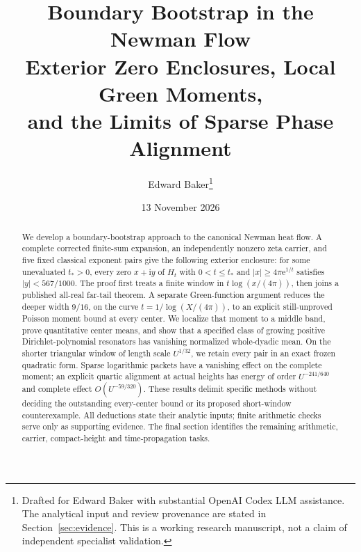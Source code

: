 \documentclass[11pt]{article}
\title{Boundary Bootstrap in the Newman Flow\\
\large Exterior Zero Enclosures, Local Green Moments,\\
and the Limits of Sparse Phase Alignment}
\author{Edward Baker\thanks{Drafted for Edward Baker with substantial OpenAI Codex LLM assistance.
The analytical input and review provenance are stated in Section~\ref{sec:evidence}.
This is a working research manuscript, not a claim of independent specialist validation.}}
\date{13 November 2026}
\theoremstyle{definition}
\theoremstyle{remark}
\newcommand{\ee}{\mathrm e}
\newcommand{\ii}{\mathrm i}
\numberwithin{equation}{section}
\begin{document}
\maketitle
\begin{abstract}
We develop a boundary-bootstrap approach to the canonical Newman heat flow.
A complete corrected finite-sum expansion, an independently nonzero zeta
carrier, and five fixed classical exponent pairs give the following
exterior enclosure: for some unevaluated $t_*>0$, every zero $x+\ii y$ of
$H_t$ with $0<t\le t_*$ and $|x|\ge4\pi\ee^{1/t}$ satisfies
$|y|<567/1000$. The proof first treats a finite window in
$t\log(x/(4\pi))$, then joins a published all-real far-tail theorem.
A separate Green-function argument reduces the deeper width $9/16$,
on the curve $t=1/\log(X/(4\pi))$, to an explicit still-unproved
Poisson moment bound at every center. We localize that moment to a
middle band, prove quantitative center means, and show that a specified
class of growing positive Dirichlet-polynomial resonators has vanishing
normalized whole-dyadic mean. On the shorter triangular window of length
scale $U^{1/32}$, we retain every pair in an exact frozen quadratic form.
Sparse logarithmic packets have a vanishing effect on the complete
moment; an explicit quartic alignment at actual heights has energy
of order $U^{-241/640}$ and complete effect $O(U^{-59/320})$.
These results delimit specific methods without deciding the outstanding
every-center bound or its proposed short-window counterexample.
All deductions state their analytic inputs; finite arithmetic checks
serve only as supporting evidence. The final section identifies the
remaining arithmetic, carrier, compact-height and time-propagation tasks.
\end{abstract}
\clearpage
{\small\tableofcontents}
\clearpage









\clearpage
\begingroup\small\raggedright

\endgroup
\end{document}
